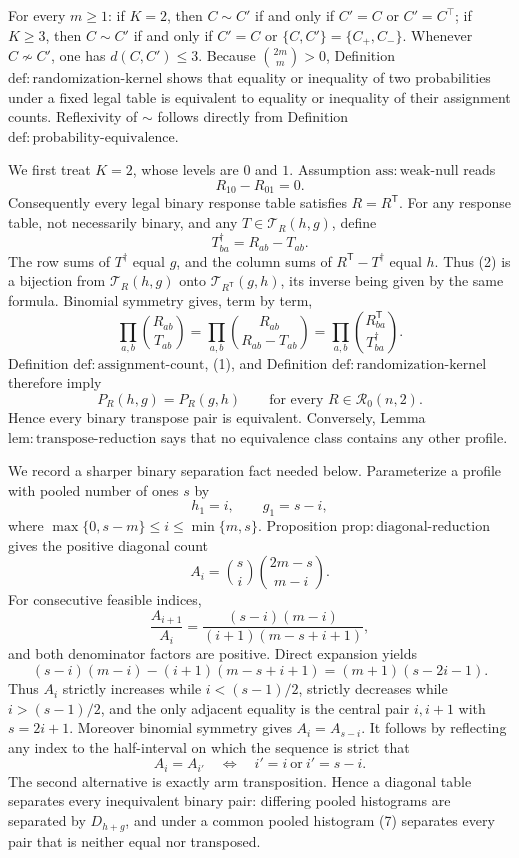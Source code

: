 For every \(m\geq1\): if \(K=2\), then \(C\sim C'\) if and only if \(C'=C\) or \(C'=C^\top\); if \(K\geq3\), then \(C\sim C'\) if and only if \(C'=C\) or \(\{C,C'\}=\{C_+,C_-\}\). Whenever \(C\not\sim C'\), one has \(d(C,C')\leq3\).
Because \(\binom{2m}{m}>0\), Definition \(\mathrm{def{:}randomization\text{-}kernel}\) shows that equality or inequality of two probabilities under a fixed legal table is equivalent to equality or inequality of their assignment counts. Reflexivity of \(\sim\) follows directly from Definition \(\mathrm{def{:}probability\text{-}equivalence}\).

We first treat \(K=2\), whose levels are \(0\) and \(1\). Assumption \(\mathrm{ass{:}weak\text{-}null}\) reads
\[
 R_{10}-R_{01}=0.
 \tag{1}
\]
Consequently every legal binary response table satisfies \(R=R^{\mathsf T}\). For any response table, not necessarily binary, and any \(T\in\mathcal T_R(h,g)\), define
\[
 T^\dagger_{ba}=R_{ab}-T_{ab}.
 \tag{2}
\]
The row sums of \(T^\dagger\) equal \(g\), and the column sums of \(R^{\mathsf T}-T^\dagger\) equal \(h\). Thus (2) is a bijection from \(\mathcal T_R(h,g)\) onto \(\mathcal T_{R^{\mathsf T}}(g,h)\), its inverse being given by the same formula. Binomial symmetry gives, term by term,
\[
 \prod_{a,b}\binom{R_{ab}}{T_{ab}}
 =\prod_{a,b}\binom{R_{ab}}{R_{ab}-T_{ab}}
 =\prod_{a,b}\binom{R^{\mathsf T}_{ba}}{T^\dagger_{ba}}.
\]
Definition \(\mathrm{def{:}assignment\text{-}count}\), (1), and Definition \(\mathrm{def{:}randomization\text{-}kernel}\) therefore imply
\[
 P_R(h,g)=P_R(g,h)
 \qquad\text{for every }R\in\mathcal R_0(n,2).
 \tag{3}
\]
Hence every binary transpose pair is equivalent. Conversely, Lemma \(\mathrm{lem{:}transpose\text{-}reduction}\) says that no equivalence class contains any other profile.

We record a sharper binary separation fact needed below. Parameterize a profile with pooled number of ones \(s\) by
\[
 h_1=i,\qquad g_1=s-i,
\]
where \(\max\{0,s-m\}\leq i\leq\min\{m,s\}\). Proposition \(\mathrm{prop{:}diagonal\text{-}reduction}\) gives the positive diagonal count
\[
 A_i=\binom{s}{i}\binom{2m-s}{m-i}.
 \tag{4}
\]
For consecutive feasible indices,
\[
 \frac{A_{i+1}}{A_i}
 =\frac{(s-i)(m-i)}{(i+1)(m-s+i+1)},
 \tag{5}
\]
and both denominator factors are positive. Direct expansion yields
\[
 (s-i)(m-i)-(i+1)(m-s+i+1)
 =(m+1)(s-2i-1).
 \tag{6}
\]
Thus \(A_i\) strictly increases while \(i<(s-1)/2\), strictly decreases while \(i>(s-1)/2\), and the only adjacent equality is the central pair \(i,i+1\) with \(s=2i+1\). Moreover binomial symmetry gives \(A_i=A_{s-i}\). It follows by reflecting any index to the half-interval on which the sequence is strict that
\[
 A_i=A_{i'}\quad\Longleftrightarrow\quad i'=i\ \text{or}\ i'=s-i.
 \tag{7}
\]
The second alternative is exactly arm transposition. Hence a diagonal table separates every inequivalent binary pair: differing pooled histograms are separated by \(D_{h+g}\), and under a common pooled histogram (7) separates every pair that is neither equal nor transposed.

